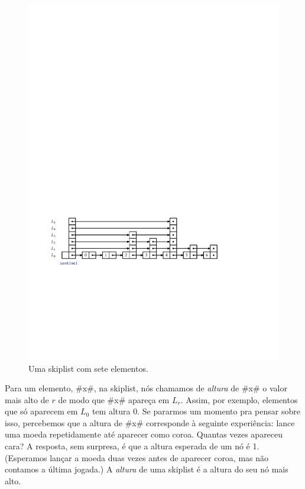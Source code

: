 \begin{figure}
  \begin{center}
    \includegraphics[width=\ScaleIfNeeded]{figs/skiplist}
  \end{center}
  \caption{Uma skiplist com sete elementos.}
\end{figure}

Para um elemento, #x#, na skiplist, nós chamamos de \emph{altura}
%
de #x# o valor mais alto de $r$ de modo que #x# apareça em $L_r$.  Assim, por exemplo,
elementos que só aparecem em $L_0$ tem altura $0$.  Se pararmos um momento pra
pensar sobre isso, percebemos que a altura de #x# corresponde
à seguinte experiência:  lance uma moeda repetidamente até aparecer
como coroa. Quantas vezes apareceu cara? A resposta, sem
surpresa, é que a altura esperada de um nó é 1. (Esperamos
lançar a moeda duas vezes antes de aparecer coroa, mas não contamos a última
jogada.) A \emph{altura} de uma skiplist é a altura do seu nó mais alto.

